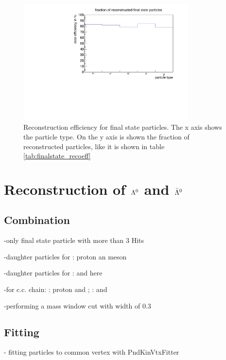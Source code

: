 	\begin{figure}
	
		\centering
		\includegraphics[width=0.8\textwidth]{./plots/finalstate/reco_efficiency.pdf}
		\caption{Reconstruction efficiency for final state particles. The x axis shows the particle type. 
				On the y axis is shown the fraction of reconstructed particles, like it is shown in table \ref{tab:finalstate_recoeff}}
		\label{fig:finalstate_recoeff}
	
	\end{figure}
	

	
\section{Reconstruction of $\boldmath{\Lambda}^0$ and $\boldmath{\bar{\Lambda}^0}$}
	\subsection{Combination}
		-only final state particle with more than 3 Hits
		
		-daughter particles for \lam: proton an \piminus meson
		
		-daughter particles for \alam: \antiproton and \piplus here \piplustwo 
		
		-for c.c. chain: \lam: proton and \piminustwo; \alam: \antiproton and \piplus 
		
		-performing a mass window cut with width of $0.3$\massunit 
		
		
	\subsection{Fitting}
	
		- fitting particles to common vertex with PndKinVtxFitter
	
